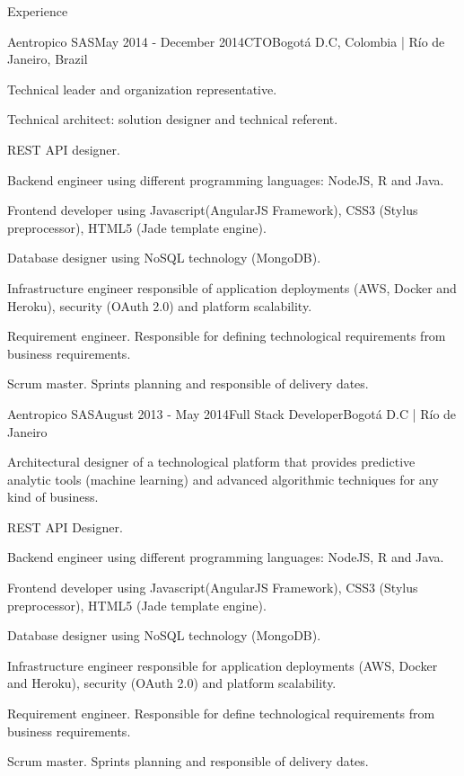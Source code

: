 \documentclass[spanish]{resume}
\begin{document}
\begin{rSection}{Experience}
\begin{rSubsection}{Aentropico SAS}{May 2014 - December 2014}{CTO}{Bogot\'a D.C, Colombia | R\'io de Janeiro, Brazil}
\item Technical leader and organization representative.
\item Technical architect: solution designer and technical referent.
\item REST API designer.
\item Backend engineer using different programming languages: NodeJS, R and Java.
\item Frontend developer using Javascript(AngularJS Framework), CSS3 (Stylus preprocessor), HTML5 (Jade template engine).
\item Database designer using NoSQL technology (MongoDB).
\item Infrastructure engineer responsible of application deployments (AWS, Docker and Heroku), security (OAuth 2.0) and platform scalability.
\item Requirement engineer. Responsible for defining technological requirements from business requirements.
\item Scrum master. Sprints planning and responsible of delivery dates.
\end{rSubsection}


\begin{rSubsection}{Aentropico SAS}{August 2013 - May 2014}{Full Stack Developer}{Bogot\'a D.C | R\'io de Janeiro}
\item Architectural designer of a technological platform that provides predictive analytic tools (machine learning) and advanced algorithmic techniques for any kind of business.
\item REST API Designer.
\item Backend engineer using different programming languages: NodeJS, R and Java.
\item Frontend developer using Javascript(AngularJS Framework), CSS3 (Stylus preprocessor), HTML5 (Jade template engine).
\item Database designer using NoSQL technology (MongoDB).
\item Infrastructure engineer responsible for application deployments (AWS, Docker and Heroku), security (OAuth 2.0) and platform scalability.
\item Requirement engineer. Responsible for define technological requirements from business requirements.
\item Scrum master. Sprints planning and responsible of delivery dates.
\end{rSubsection}


\end{rSection}
\end{document}
